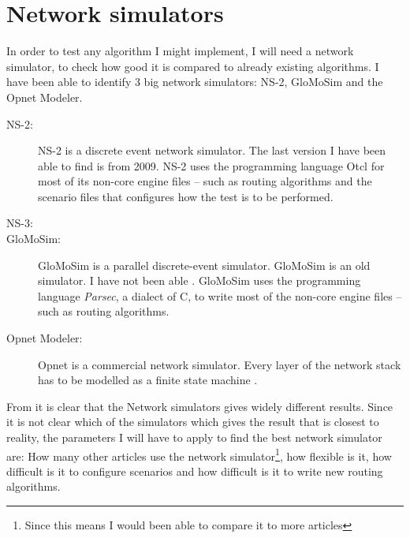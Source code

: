 \section{Network simulators}

In order to test any algorithm I might implement, I will need a network simulator, to check how good it is compared to already existing algorithms. I have been able to identify 3 big network simulators: NS-2, GloMoSim and the Opnet Modeler.

\begin{description}
\item[NS-2:] NS-2 is a discrete event network simulator. The last version I have been able to find is from 2009. NS-2 uses the programming language Otcl for most of its non-core engine files -- such as routing algorithms and the scenario files that configures how the test is to be performed.
\item[NS-3:]
\item[GloMoSim:] GloMoSim is a parallel discrete-event simulator. GloMoSim is an old simulator. I have not been able   . GloMoSim uses the programming language \emph{Parsec}, a dialect of C, to write most of the non-core engine files -- such as routing algorithms. 
\item[Opnet Modeler:] Opnet is a commercial network simulator. Every layer of the network stack has to be modelled as a finite state machine \cite{MANcom}.
\end{description}

From \cite{MANcom} it is clear that the Network simulators gives widely different results. Since it is not clear which of the simulators which gives the result that is closest to reality, the parameters I will have to apply to find the best network simulator are: How many other articles use the network simulator\footnote{Since this means I would been able to compare it to more articles}, how flexible is it, how difficult is it to configure scenarios and how difficult is it to write new routing algorithms.

